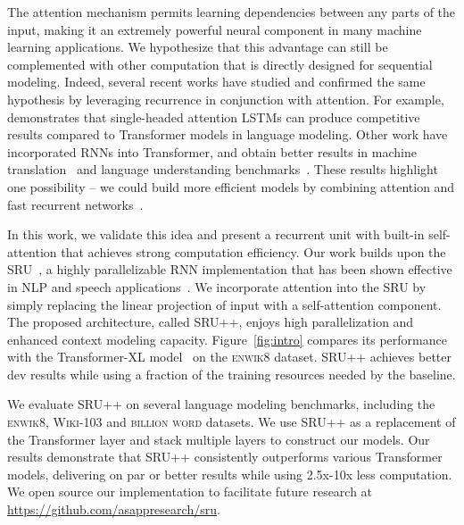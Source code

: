\documentclass[11pt,a4paper]{article}
\begin{document}
The attention mechanism permits learning dependencies between any parts of the input, making it an extremely powerful neural component in many machine learning applications.
We hypothesize that this advantage can still be complemented with other computation that is directly designed for sequential modeling.
Indeed, several recent works have studied and confirmed the same hypothesis by leveraging recurrence in conjunction with attention.
For example, \citet{merity2019single} demonstrates that single-headed attention LSTMs can produce competitive results compared to Transformer models in language modeling.
Other work have incorporated RNNs into Transformer, and obtain better results in machine translation~\cite{lei2018sru} and language understanding benchmarks~\cite{huang2020transblstm}.
These results highlight one possibility -- we could build more efficient models by combining attention and fast recurrent networks~\cite{bradbury2016quasi,skiprnn,zhang-sennrich-2019-lightweight}.


In this work, we validate this idea and present a recurrent unit with built-in self-attention that achieves strong computation efficiency.
Our work builds upon the SRU~\cite{lei2018sru}, a highly parallelizable RNN implementation that has been shown effective in NLP and speech applications~\cite{park2018fully,shangguan2020optimizing,lin-etal-2020-autoregressive}. 
We incorporate attention into the SRU by simply replacing the linear projection of input with a self-attention component.
The proposed architecture, called SRU++, enjoys high parallelization and enhanced context modeling capacity.
Figure~\ref{fig:intro} compares its performance with the Transformer-XL model~\cite{dai-etal-2019-transformer} on the \textsc{enwik8} dataset.
SRU++ achieves better dev results while using a fraction of the training resources needed by the baseline.

We evaluate SRU++ on several language modeling benchmarks, including the \textsc{enwik8}, \textsc{Wiki-103} and \textsc{billion word} datasets.
We use SRU++ as a replacement of the Transformer layer and stack multiple layers to construct our models.
Our results demonstrate that SRU++ consistently outperforms various Transformer models, delivering on par or better results while using 2.5x-10x less computation.
We open source our implementation to facilitate future research at \url{https://github.com/asappresearch/sru}.
\end{document}
